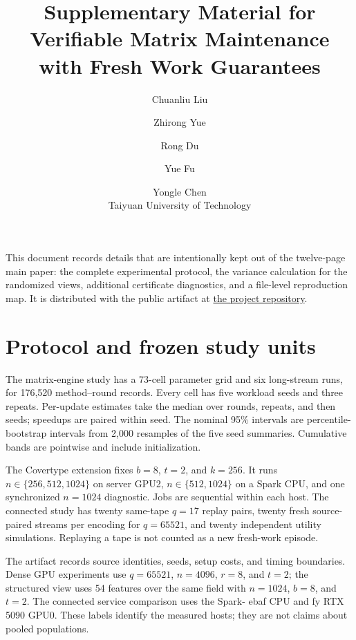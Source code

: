 \documentclass[10pt]{article}
\title{Supplementary Material for\\Verifiable Matrix Maintenance with Fresh Work Guarantees}
\author{Chuanliu Liu \and Zhirong Yue \and Rong Du \and Yue Fu \and Yongle Chen\\
Taiyuan University of Technology}
\date{}
\begin{document}
\maketitle

This document records details that are intentionally kept out of the twelve-page
main paper: the complete experimental protocol, the variance calculation for
the randomized views, additional certificate diagnostics, and a file-level
reproduction map. It is distributed with the public artifact at
\href{https://github.com/fuyuefyu/verifiable-matrix-maintenance}{the project repository}.

\section{Protocol and frozen study units}
The matrix-engine study has a 73-cell parameter grid and six long-stream
runs, for 176,520 method--round records. Every cell has five workload seeds
and three repeats. Per-update estimates take the median over rounds, repeats,
and then seeds; speedups are paired within seed. The nominal 95\% intervals
are percentile-bootstrap intervals from 2,000 resamples of the five seed
summaries. Cumulative bands are pointwise and include initialization.

The Covertype extension fixes $b=8$, $t=2$, and $k=256$. It runs
$n\in\{256,512,1024\}$ on server GPU2, $n\in\{512,1024\}$ on a Spark
CPU, and one synchronized $n=1024$ diagnostic. Jobs are sequential within
each host. The connected study has twenty same-tape $q=17$ replay pairs,
twenty fresh source-paired streams per encoding for $q=65521$, and twenty
independent utility simulations. Replaying a tape is not counted as a new
fresh-work episode.

The artifact records source identities, seeds, setup costs, and timing
boundaries. Dense GPU experiments use $q=65521$, $n=4096$, $r=8$, and
$t=2$; the structured view uses 54 features over the same field with
$n=1024$, $b=8$, and $t=2$. The connected service comparison uses the Spark-
ebaf CPU and fy RTX 5090 GPU0. These labels identify the measured hosts; they
are not claims about pooled populations.
\end{document}
